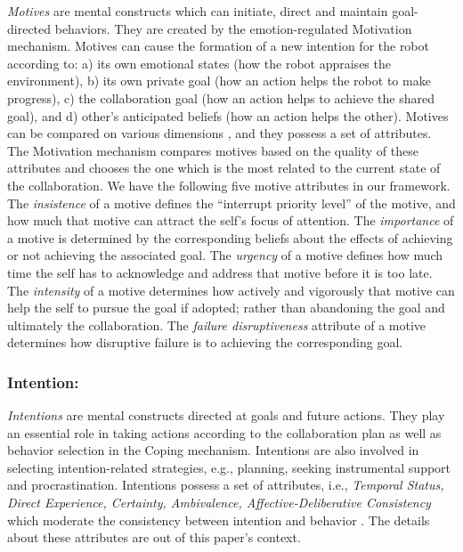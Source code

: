 \documentclass{aamas2016}
\begin{document}
\textit{Motives} are mental constructs which can initiate, direct and maintain
goal-directed behaviors. They are created by the emotion-regulated Motivation
mechanism. Motives can cause the formation of a new intention for the robot
according to: a) its own emotional states (how the robot appraises the
environment), b) its own private goal (how an action helps the robot to make
progress), c) the collaboration goal (how an action helps to achieve the shared
goal), and d) other's anticipated beliefs (how an action helps the other).
Motives can be compared on various dimensions \cite{sloman:motivation}, and
they possess a set of attributes. The Motivation mechanism compares motives
based on the quality of these attributes and chooses the one which is the most
related to the current state of the collaboration. We have the following five
motive attributes in our framework. The \textit{insistence} of a motive defines
the ``interrupt priority level'' of the motive, and how much that motive can
attract the self's focus of attention. The \textit{importance} of a motive is
determined by the corresponding beliefs about the effects of achieving or not
achieving the associated goal. The \textit{urgency} of a motive defines how much
time the self has to acknowledge and address that motive before it is too late.
The \textit{intensity} of a motive determines how actively and vigorously that
motive can help the self to pursue the goal if adopted; rather than abandoning
the goal and ultimately the collaboration. The \textit{failure disruptiveness}
attribute of a motive determines how disruptive failure is to achieving the
corresponding goal.

\vspace*{-2mm}
\subsubsection{Intention:}

\textit{Intentions} are mental constructs directed at goals and future actions.
They play an essential role in taking actions according to the collaboration
plan as well as behavior selection in the Coping mechanism. Intentions are
also involved in selecting intention-related strategies, e.g., planning, seeking
instrumental support and procrastination. Intentions possess a set of
attributes, i.e., \textit{Temporal Status, Direct Experience, Certainty,
Ambivalence, Affective-Deliberative Consistency} which moderate the consistency
between intention and behavior \cite{cooke:intention-behavior-consistency}. The
details about these attributes are out of this paper's context.
\end{document}

